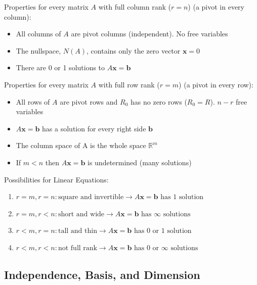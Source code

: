 \documentclass[11pt]{article}
\begin{document}
Properties for every matrix $A$ with full column rank ($r=n$) (a pivot in every column):
\begin{itemize}
    \item All columns of $A$ are pivot columns (independent). No free variables
    \item The nullspace, $N(A)$, contains only the zero vector $\boldsymbol{x} = 0$
    \item There are 0 or 1 solutions to $A\boldsymbol{x}=\boldsymbol{b}$
\end{itemize}

Properties for every matrix $A$ with full row rank ($r=m$) (a pivot in every row):
\begin{itemize}
    \item All rows of $A$ are pivot rows and $R_0$ has no zero rows ($R_0 = R$). $n-r$ free 
    variables
    \item $A\boldsymbol{x}=\boldsymbol{b}$ has a solution for every right side $\boldsymbol{b}$
    \item The column space of A is the whole space $\mathbb{R}^m$
    \item If $m < n$ then $A\boldsymbol{x}=\boldsymbol{b}$ is undetermined (many solutions)
\end{itemize}

Possibilities for Linear Equations:
\begin{enumerate}
    \item $r=m, r=n: \text{square and invertible} \rightarrow A\boldsymbol{x}=\boldsymbol{b} 
    \text{ has 1 solution}$
    \item $r=m, r<n: \text{short and wide} \rightarrow A\boldsymbol{x}=\boldsymbol{b} \text{ 
    has } \infty \text{ solutions}$
    \item $r<m, r=n: \text{tall and thin} \rightarrow A\boldsymbol{x}=\boldsymbol{b} \text{ has
    0 or 1 solution}$
    \item $r<m, r<n: \text{not full rank} \rightarrow A\boldsymbol{x}=\boldsymbol{b} \text{ has
    0 or } \infty \text{ solutions}$
\end{enumerate}

\subsection{Independence, Basis, and Dimension}
\end{document}
